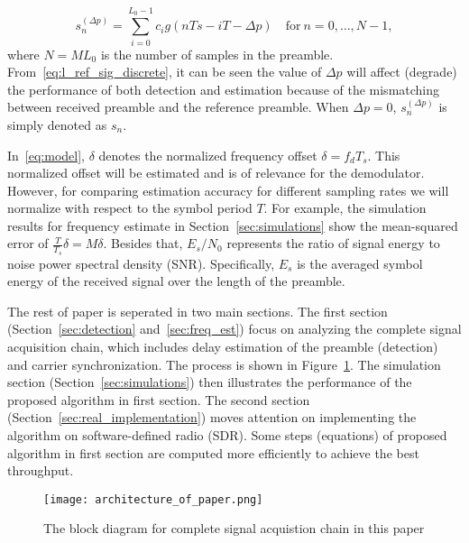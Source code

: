 \begin{equation}
  \label{eq:l_ref_sig_discrete}
  s_n^{(\Delta p)} = \sum_{i=0}^{L_0-1} c_i g(nTs-iT-\Delta p) \quad \text{for}~n=0,\ldots,N-1,
\end{equation}
where $N=ML_0$ is the number of samples in the preamble. 
From~\eqref{eq:l_ref_sig_discrete}, it can be seen the value of $\Delta p$ will affect (degrade) the performance of both detection and estimation 
because of the mismatching between received preamble and the reference preamble.
When $\Delta p=0$, $s_n^{(\Delta p)}$ is simply denoted as $s_n$.

In~\eqref{eq:model}, $\delta$ denotes the normalized frequency offset $\delta=f_dT_s$. This normalized offset
will be estimated and is of relevance for the demodulator. However, for comparing estimation accuracy for different
sampling rates we will normalize with respect to the symbol period $T$. For example, the simulation results for frequency estimate 
in Section~\ref{sec:simulations} show the mean-squared error of $\frac{T}{T_s}\delta=M\delta$.
Besides that, $E_s/N_0$ represents the ratio of signal energy to noise power spectral density (SNR).
Specifically, $E_s$ is the averaged symbol energy of the received signal over the length of the preamble.

The rest of paper is seperated in two main sections. The first section (Section~\ref{sec:detection} and~\ref{sec:freq_est}) focus on analyzing the complete
signal acquisition chain, which includes delay estimation of the preamble (detection) and
carrier synchronization. The process is shown in Figure~\ref{fig:sig_acquis_chain}.
The simulation section (Section~\ref{sec:simulations}) then illustrates the performance of the proposed algorithm in first section.
The second section (Section~\ref{sec:real_implementation}) moves attention on implementing the algorithm 
on software-defined radio (SDR). Some steps (equations) of proposed algorithm in first section are computed more efficiently to achieve the best throughput.

\begin{figure}[t]
  \centerline{\texttt{[image: architecture\_of\_paper.png]}}
  \caption{The block diagram for complete signal acquistion chain in this paper}
  \label{fig:sig_acquis_chain}
  \end{figure}